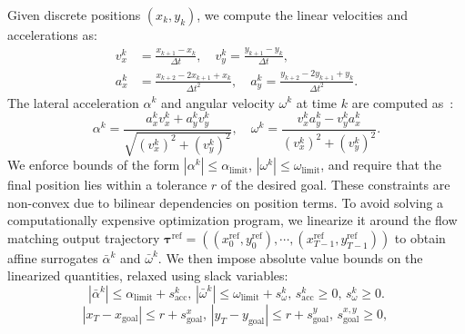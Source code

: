 \documentclass[conference]{IEEEtran}
\begin{document}
Given discrete positions \((x_k, y_k)\), we compute the linear velocities and accelerations as:
\begin{align*}
    v_x^k &= \frac{x_{k+1} - x_k}{\Delta t}, \quad
    v_y^k = \frac{y_{k+1} - y_k}{\Delta t}, \\
    a_x^k &= \frac{x_{k+2} - 2x_{k+1} + x_k}{\Delta t^2}, \quad
    a_y^k = \frac{y_{k+2} - 2y_{k+1} + y_k}{\Delta t^2}.
\end{align*}
The lateral acceleration \( \alpha^k \) and angular velocity \( \omega^k \) at time \( k \) are computed as~\cite{modeling_dynamics}: 
\[
\alpha^k = \frac{a_x^k v_x^k + a_y^k v_y^k}{\sqrt{(v_x^k)^2 + (v_y^k)^2}}, \quad
\omega^k = \frac{v_x^k a_y^k - v_y^k a_x^k}{(v_x^k)^2 + (v_y^k)^2}.
\]
We enforce bounds of the form \( |\alpha^k| \leq \alpha_{\text{limit}} \), \( |\omega^k| \leq \omega_{\text{limit}} \), and require that the final position lies within a tolerance \( r \) of the desired goal. These constraints are non-convex due to bilinear dependencies on position terms. To avoid solving a computationally expensive optimization program, we linearize it around the flow matching output trajectory \(\mathbf{\tau}^{\text{ref}}=((x_0^{\text{ref}}, y_0^{\text{ref}}), \cdots, (x_{T-1}^{\text{ref}}, y_{T-1}^{\text{ref}}))\) to obtain affine surrogates \( \bar{\alpha}^k \) and \( \bar{\omega}^k \). We then impose absolute value bounds on the linearized quantities, relaxed using slack variables:
\begin{equation}
|\bar{\alpha}^k| \leq \alpha_{\text{limit}} + s_{\text{acc}}^k, \,
|\bar{\omega}^k| \leq \omega_{\text{limit}} + s_{\omega}^k, \,
s_{\text{acc}}^k \geq 0,\, s_{\omega}^k \geq 0.
\label{eq:accel_constraints}
\end{equation}
\begin{equation}
|x_T - x_{\text{goal}}| \leq r + s_{\text{goal}}^x, \,
|y_T - y_{\text{goal}}| \leq r + s_{\text{goal}}^y, \,
s_{\text{goal}}^{x,y} \geq 0,\,
\label{eq:goal_constraints}
\end{equation}
\end{document}
